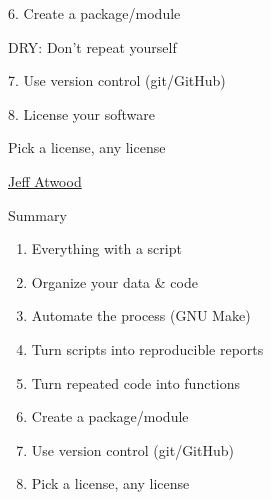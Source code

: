 \documentclass[12pt,t]{beamer}
\begin{document}
\begin{frame}[c]{6. Create a package/module}

  \centering
  \Large
  {\hilit DRY}: Don't repeat yourself

\end{frame}


\begin{frame}[c]{7. Use version control (git/GitHub)}


\centering



\note{
}
\end{frame}



\begin{frame}{8. License your software}

\vspace{60pt}

\centerline{\large Pick a license, any license}

\vspace{18pt}

\hfill
{\textendash} \href{http://blog.codinghorror.com/pick-a-license-any-license/}{Jeff Atwood}

\note{
}
\end{frame}


\begin{frame}[c]{Summary}

  \begin{enumerate}
  \itemsep12pt
  \item Everything with a script
  \item Organize your data \& code
  \item Automate the process (GNU Make)
  \item Turn scripts into reproducible reports
  \item Turn repeated code into functions
  \item Create a package/module
  \item Use version control (git/GitHub)
  \item Pick a license, any license
  \end{enumerate}

\note{
}
\end{frame}
\end{document}
